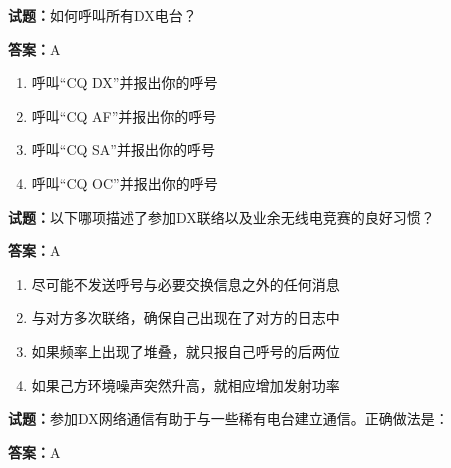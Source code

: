 \documentclass{ctexbook}
\begin{document}




\vspace{1em}

\textbf{试题：}如何呼叫所有DX电台？ 

\textbf{答案：}A 

\begin{enumerate}[leftmargin=3em]
  \item 呼叫“CQ DX”并报出你的呼号 

  \item 呼叫“CQ AF”并报出你的呼号 

  \item 呼叫“CQ SA”并报出你的呼号 

  \item 呼叫“CQ OC”并报出你的呼号 

\end{enumerate}





\vspace{1em}

\textbf{试题：}以下哪项描述了参加DX联络以及业余无线电竞赛的良好习惯？ 

\textbf{答案：}A 

\begin{enumerate}[leftmargin=3em]
  \item 尽可能不发送呼号与必要交换信息之外的任何消息 

  \item 与对方多次联络，确保自己出现在了对方的日志中 

  \item 如果频率上出现了堆叠，就只报自己呼号的后两位 

  \item 如果己方环境噪声突然升高，就相应增加发射功率 

\end{enumerate}





\vspace{1em}

\textbf{试题：}参加DX网络通信有助于与一些稀有电台建立通信。正确做法是： 

\textbf{答案：}A 
\end{document}
